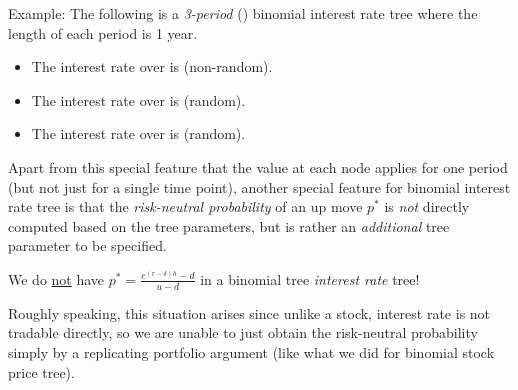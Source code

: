 \begin{enumerate}
Example: The following is a \emph{3-period} (\warn{}) binomial interest rate
tree where the length of each period is 1 year.
\begin{center}
\end{center}
\begin{itemize}
\item The interest rate over  is  (non-random).
\item The interest rate over  is  (random).
\item The interest rate over  is  (random).
\end{itemize}
Apart from this special feature that the value at each node applies for one
period (but not just for a single time point), another special feature for
binomial interest rate tree is that the \emph{risk-neutral probability} of an
up move \(p^{*}\) is \emph{not} directly computed based on the tree parameters,
but is rather an \emph{additional} tree parameter to be specified. \begin{warning}
We do \underline{not} have \(p^{*}=\frac{e^{(r-\delta)h}-d}{u-d}\) in a
binomial tree \emph{interest rate} tree!
\end{warning}
\begin{note}
Roughly speaking, this situation arises since unlike a stock, interest rate is
not tradable directly, so we are unable to just obtain the risk-neutral
probability simply by a replicating portfolio argument (like what we did for
binomial stock price tree).
\end{note}


\end{enumerate}
